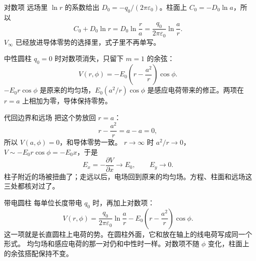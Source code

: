 \documentclass[fontset=windows, chinese, 10pt, xcolor=dvipsnames]{beamer}
\begin{document}
\begin{frame}{对数项}
  远场里 $\ln r$ 的系数给出 $D_0=-q_0/(2\pi\varepsilon_0)$。柱面上 $C_0=-D_0\ln a$，所以
  \begin{equation*}
    C_0+D_0\ln r
    =D_0\ln\frac{r}{a}
    =\frac{q_0}{2\pi\varepsilon_0}\ln\frac{a}{r}.
  \end{equation*}
  $V_{\infty}$ 已经放进导体零势的选择里，式子里不再单写。
\end{frame}

\begin{frame}{中性圆柱}
  $q_0=0$ 时对数项消失，只留下 $m=1$ 的余弦：
  \begin{equation*}
    \boxed{V(r,\phi)
    =-E_0\left(r-\frac{a^2}{r}\right)\cos\phi.}
  \end{equation*}
  $-E_0 r\cos\phi$ 是原来的均匀场，$E_0(a^2/r)\cos\phi$ 是感应电荷带来的修正。两项在 $r=a$ 上相加为零，导体保持零势。
\end{frame}

\begin{frame}{代回边界和远场}
  把这个势放回 $r=a$：
  \begin{equation*}
    r-\frac{a^2}{r}=a-a=0,
  \end{equation*}
  所以 $V(a,\phi)=0$，和导体零势一致。
  \vspace{0.35em}
  $r\to\infty$ 时 $a^2/r\to 0$，$V\sim -E_0 r\cos\phi=-E_0 x$，于是
  \begin{equation*}
    E_x=-\frac{\partial V}{\partial x}\to E_0,
    \qquad E_y\to 0.
  \end{equation*}
  柱子附近的场被扭曲了；走远以后，电场回到原来的均匀场。方程、柱面和远场这三处都核对过了。
\end{frame}

\begin{frame}{带电圆柱}
  每单位长度带电 $q_0$ 时，再加上对数项：
  \begin{equation*}
    V(r,\phi)
    =\frac{q_0}{2\pi\varepsilon_0}\ln\frac{a}{r}
    -E_0\left(r-\frac{a^2}{r}\right)\cos\phi.
  \end{equation*}
  这一项就是长直圆柱上电荷的势。在圆柱外面，它和放在轴上的线电荷写成同一个形式。
  \vspace{0.3em}
  均匀场和感应电荷的那一对仍和中性时一样。对数项不随 $\phi$ 变化，柱面上的余弦搭配保持不变。
\end{frame}
\end{document}
